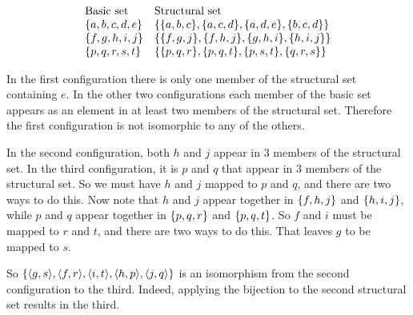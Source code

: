 \documentclass{report}
\begin{document}
\begin{exercise}
\[
\begin{array}{ll}
    \text{Basic set} & \text{Structural set}\\
    \set{a,b,c,d,e} & \set{\set{a,b,c},\set{a,c,d},\set{a,d,e},\set{b,c,d}}\\
    \set{f,g,h,i,j} & \set{\set{f,g,j},\set{f,h,j},\set{g,h,i},\set{h,i,j}}\\
    \set{p,q,r,s,t} & \set{\set{p,q,r},\set{p,q,t},\set{p,s,t},\set{q,r,s}}
\end{array}
\]
\end{exercise}

\begin{solution}
In the first configuration there is only one member of the structural set containing $e$.
In the other two configurations each member of the basic set appears as an element in
at least two members of the structural set. Therefore the first configuration is not isomorphic
to any of the others.

In the second configuration, both $h$ and $j$ appear in 3 members of the structural set.
In the third configuration, it is $p$ and $q$ that appear in 3 members of the structural set.
So we must have $h$ and $j$ mapped to $p$ and $q$, and there are two ways to do this.
Now note that $h$ and $j$ appear together in $\left\{f,h,j\right\}$ and $\left\{h,i,j\right\}$, while $p$ and $q$
appear together in $\left\{p,q,r\right\}$ and $\left\{p,q,t\right\}$.
So $f$ and $i$ must be mapped to $r$ and $t$, and there are two ways to do this.
That leaves $g$ to be mapped to $s$.

So $\set{\aprn{g,s},\aprn{f,r},\aprn{i,t},\aprn{h,p},\aprn{j,q}}$ is an isomorphism
from the second configuration to the third. Indeed, applying the bijection to
the second structural set results in the third.
\end{solution}
\end{document}
